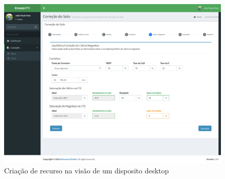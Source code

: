\begin{figure}[H]
    \centering
    \includegraphics[width=13cm]{./dados/figuras/prototipos/create_desktop.png}
    \caption{Criação de recurso na visão de um disposito desktop}
    \label{fig:prototipo_create_desk}
\end{figure}

